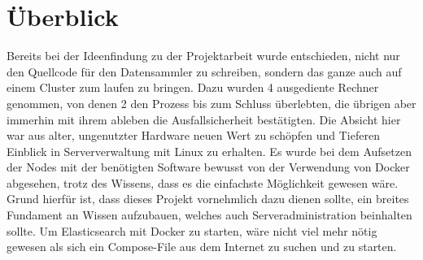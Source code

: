 \documentclass[12pt,oneside,a4paper,parskip]{scrbook}
\begin{document}
\section{Überblick} Bereits bei der Ideenfindung zu der Projektarbeit wurde entschieden, nicht nur den Quellcode für den Datensammler zu schreiben, sondern das ganze auch auf einem Cluster zum laufen zu bringen. Dazu wurden 4 ausgediente Rechner genommen, von denen 2 den Prozess bis zum Schluss überlebten, die übrigen aber immerhin mit ihrem ableben die Ausfallsicherheit bestätigten. Die Absicht hier war aus alter, ungenutzter Hardware neuen Wert zu schöpfen und Tieferen Einblick in Serververwaltung mit Linux zu erhalten. Es wurde bei dem Aufsetzen der Nodes mit der benötigten Software bewusst von der Verwendung von Docker abgesehen, trotz des Wissens, dass es die einfachste Möglichkeit gewesen wäre. Grund hierfür ist, dass dieses Projekt vornehmlich dazu dienen sollte, ein breites Fundament an Wissen aufzubauen, welches auch Serveradministration beinhalten sollte. Um Elasticsearch mit Docker zu starten, wäre nicht viel mehr nötig gewesen als sich ein Compose-File aus dem Internet zu suchen und zu starten.
\end{document}

